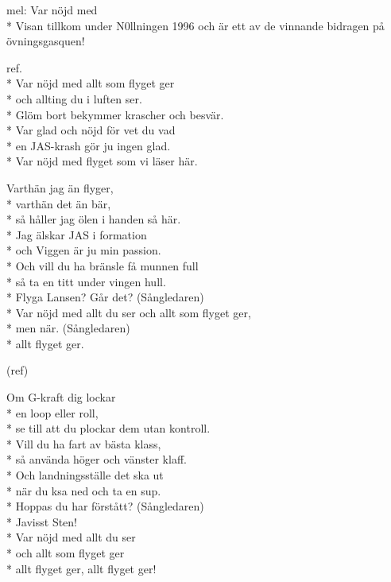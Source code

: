 \begin{SongText}[Stigfinarvisan]
    \begin{SongInfo}
        mel: Var nöjd med\\*%
        Visan tillkom under N0llningen 1996 och är ett av de vinnande bidragen på övningsgasquen!
    \end{SongInfo}
    \begin{SongVerse}
        ref.\\*%
        Var nöjd med allt som flyget ger\\*%
        och allting du i luften ser.\\*%
        Glöm bort bekymmer krascher och besvär.\\*%
        Var glad och nöjd för vet du vad\\*%
        en JAS-krash gör ju ingen glad.\\*%
        Var nöjd med flyget som vi läser här.
    \end{SongVerse}
    \begin{SongVerse}
        Varthän jag än flyger,\\*%
        varthän det än bär,\\*%
        så håller jag ölen i handen så här.\\*%
        Jag älskar JAS i formation\\*%
        och Viggen är ju min passion.\\*%
        Och vill du ha bränsle få munnen full\\*%
        så ta en titt under vingen hull.\\*%
        Flyga Lansen? Går det? (Sångledaren)\\*%
        Var nöjd med allt du ser och allt som flyget ger,\\*%
        men när. (Sångledaren)\\*%
        allt flyget ger.
    \end{SongVerse}
    \begin{SongVerse}
        (ref)
    \end{SongVerse}
    \begin{SongVerse}
        Om G-kraft dig lockar\\*%
        en loop eller roll,\\*%
        se till att du plockar dem utan kontroll.\\*%
        Vill du ha fart av bästa klass,\\*%
        så använda höger och vänster klaff.\\*%
        Och landningsställe det ska ut\\*%
        när du ksa ned och ta en sup.\\*%
        Hoppas du har förstått? (Sångledaren)\\*%
        Javisst Sten!\\*%
        Var nöjd med allt du ser\\*%
        och allt som flyget ger\\*%
        allt flyget ger, allt flyget ger!
    \end{SongVerse}
\end{SongText}
